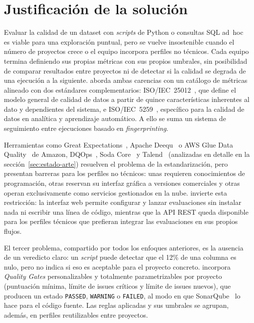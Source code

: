 \section{Justificación de la solución}
\label{sec:justificacion}

Evaluar la calidad de un dataset con \emph{scripts} de Python o consultas
\ac{SQL} ad~hoc es viable para una exploración puntual, pero se vuelve
insostenible cuando el número de proyectos crece o el equipo incorpora
perfiles no técnicos.  Cada equipo termina definiendo sus propias métricas
con sus propios umbrales, sin posibilidad de comparar resultados entre
proyectos ni de detectar si la calidad se degrada de una ejecución a la
siguiente.  \dataqual aborda ambas carencias con un catálogo de métricas
alineado con dos estándares complementarios: \ac{ISO}/\ac{IEC}~25012~\citep{iso25012},
que define el modelo general de calidad de datos a partir de quince
características inherentes al dato y dependientes del sistema, e
\ac{ISO}/\ac{IEC}~5259~\citep{iso5259}, específico para la calidad de datos en
analítica y aprendizaje automático.  A ello se suma un sistema de
seguimiento entre ejecuciones basado en \emph{fingerprinting}.

Herramientas como Great Expectations~\citep{greatexpectations}, Apache
Deequ~\citep{schelter2018} o \ac{AWS} Glue Data Quality~\citep{awsgluedq} de
Amazon, DQOps~\citep{dqops}, Soda Core~\citep{sodacore} y
Talend~\citep{talend} (analizadas en detalle en la
sección~\ref{sec:estado-arte}) resuelven el problema de la estandarización,
pero presentan barreras para los perfiles no técnicos: unas requieren
conocimientos de programación, otras reservan su interfaz gráfica a
versiones comerciales y otras operan exclusivamente como servicios
gestionados en la nube.  \dataqual invierte esta restricción: la interfaz
web permite configurar y lanzar evaluaciones sin instalar nada ni escribir
una línea de código, mientras que la \ac{API} \ac{REST} queda disponible
para los perfiles técnicos que prefieran integrar las evaluaciones en sus
propios flujos.

El tercer problema, compartido por todos los enfoques anteriores, es la
ausencia de un veredicto claro: un \emph{script} puede detectar que el 12\%
de una columna es nulo, pero no indica si eso es aceptable para el proyecto
concreto.  \dataqual incorpora \emph{Quality Gates} personalizables y
totalmente parametrizables por proyecto (puntuación mínima, límite de
issues críticos y límite de issues nuevos), que producen un estado
\texttt{PASSED}, \texttt{WARNING} o \texttt{FAILED}, al modo en que
SonarQube~\citep{sonarqube} lo hace para el código fuente.  Las reglas
aplicadas y sus umbrales se agrupan, además, en perfiles reutilizables
entre proyectos.

